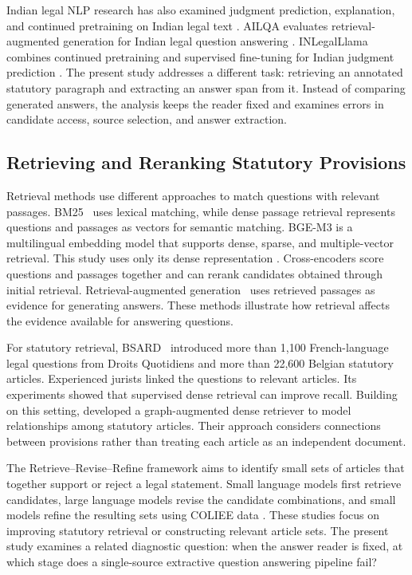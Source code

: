 \documentclass[pdflatex,sn-basic]{sn-jnl}%
\theoremstyle{thmstyleone}%
\theoremstyle{thmstyletwo}%
\theoremstyle{thmstylethree}%
\begin{document}
Indian legal NLP research has also examined judgment prediction, explanation,
and continued pretraining on Indian legal text
\citep{malikILDCCJPEIndian2021,paul2023pre}. AILQA evaluates
retrieval-augmented generation for Indian legal question answering
\citep{nigam2026ailqa}. INLegalLlama combines continued pretraining and
supervised fine-tuning for Indian judgment prediction
\citep{nigamNyayaAnumanaINLegalLlamaLargest2025}. The present study addresses
a different task: retrieving an annotated statutory paragraph and extracting
an answer span from it. Instead of comparing generated answers, the analysis
keeps the reader fixed and examines errors in candidate access, source
selection, and answer extraction.

\subsection{Retrieving and Reranking Statutory Provisions}

Retrieval methods use different approaches to match questions with relevant
passages. BM25~\citep{robertsonProbabilisticRelevanceFramework2009} uses
lexical matching, while dense passage retrieval
\citep{karpukhinDensePassageRetrieval2020} represents questions and passages
as vectors for semantic matching. BGE-M3 is a multilingual embedding model
that supports dense, sparse, and multiple-vector retrieval. This study uses
only its dense representation \citep{chenM3Embedding2024}. Cross-encoders
\citep{gao2021rethinkbert} score questions and passages together and can
rerank candidates obtained through initial retrieval. Retrieval-augmented
generation~\citep{lewisRetrievalAugmentedGenerationKnowledgeIntensive2020}
uses retrieved passages as evidence for generating answers. These methods
illustrate how retrieval affects the evidence available for answering
questions.

For statutory retrieval, BSARD~\citep{louisSpanakisBSARD2022} introduced more
than 1,100 French-language legal questions from Droits Quotidiens and more than
22,600 Belgian statutory articles. Experienced jurists linked the questions to
relevant articles. Its experiments showed that supervised dense retrieval can
improve recall. Building on this setting, \citet{louisFindingLaw2023}
developed a graph-augmented dense retriever to model relationships among
statutory articles. Their approach considers connections between provisions
rather than treating each article as an independent document.

The Retrieve--Revise--Refine framework aims to identify small sets of articles
that together support or reject a legal statement. Small language models first
retrieve candidates, large language models revise the candidate combinations,
and small models refine the resulting sets using COLIEE data
\citep{nguyen2025retrievereviserefine}. These studies focus on improving
statutory retrieval or constructing relevant article sets. The present study
examines a related diagnostic question: when the answer reader is fixed, at
which stage does a single-source extractive question answering pipeline fail?
\end{document}
